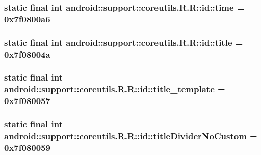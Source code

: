 \hypertarget{classandroid_1_1support_1_1coreutils_1_1_r_1_1id_a822097f1e6f3002db663e2e931ebd4e}{
\subsubsection[{time}]{\setlength{\rightskip}{0pt plus 5cm}static final int android::support::coreutils.R.R::id::time = 0x7f0800a6}}
\label{classandroid_1_1support_1_1coreutils_1_1_r_1_1id_a822097f1e6f3002db663e2e931ebd4e}


\hypertarget{classandroid_1_1support_1_1coreutils_1_1_r_1_1id_bb8b04bf4708c5611ca83e8c1b3be241}{
\subsubsection[{title}]{\setlength{\rightskip}{0pt plus 5cm}static final int android::support::coreutils.R.R::id::title = 0x7f08004a}}
\label{classandroid_1_1support_1_1coreutils_1_1_r_1_1id_bb8b04bf4708c5611ca83e8c1b3be241}


\hypertarget{classandroid_1_1support_1_1coreutils_1_1_r_1_1id_da6b901f75255f43d58bd59ac16e74c0}{
\subsubsection[{title\_\-template}]{\setlength{\rightskip}{0pt plus 5cm}static final int android::support::coreutils.R.R::id::title\_\-template = 0x7f080057}}
\label{classandroid_1_1support_1_1coreutils_1_1_r_1_1id_da6b901f75255f43d58bd59ac16e74c0}


\hypertarget{classandroid_1_1support_1_1coreutils_1_1_r_1_1id_afb4fbdc0e6f7aa60d4e4fab99228e52}{
\subsubsection[{titleDividerNoCustom}]{\setlength{\rightskip}{0pt plus 5cm}static final int android::support::coreutils.R.R::id::titleDividerNoCustom = 0x7f080059}}
\label{classandroid_1_1support_1_1coreutils_1_1_r_1_1id_afb4fbdc0e6f7aa60d4e4fab99228e52}


